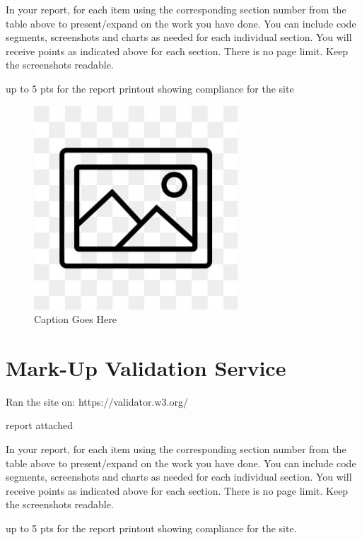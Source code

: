 \documentclass[12pt, letterpaper]{article}
\begin{document}
In your report, for each item using the corresponding section number from the table above to present/expand on the work you have done. You can include code segments, screenshots and charts as needed for each individual section. You will receive points as indicated above for each section. There is no page limit. Keep the screenshots readable.

up to 5 pts for the report printout showing compliance for the site

\begin{figure}[htbp]
	\centering
	\includegraphics[width=3in]{images/placeholder.jpg}
	\caption{Caption Goes Here}
 \end{figure}

 \newpage

\section{Mark-Up Validation Service}

Ran the site on: https://validator.w3.org/

report attached

In your report, for each item using the corresponding section number from the table above to present/expand on the work you have done. You can include code segments, screenshots and charts as needed for each individual section. You will receive points as indicated above for each section. There is no page limit. Keep the screenshots readable.

up to 5 pts for the report printout showing compliance for the site.
\end{document}
